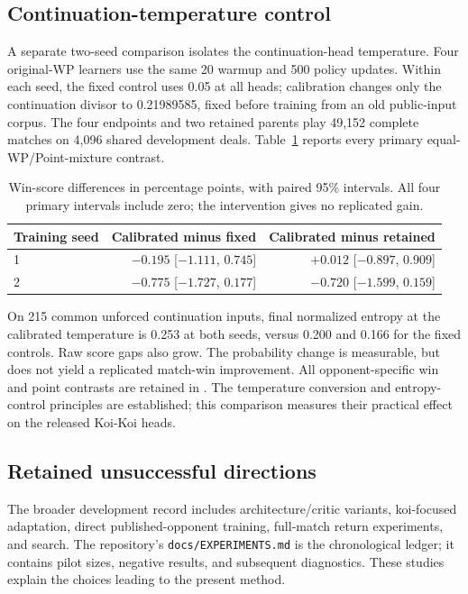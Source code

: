\documentclass[11pt]{article}
\begin{document}
\subsection{Continuation-temperature control}
\label{app:temperature}
A separate two-seed comparison isolates the continuation-head temperature.
Four original-WP learners use the same 20 warmup and 500 policy updates.
Within each seed, the fixed control uses 0.05 at all heads; calibration changes
only the continuation divisor to 0.21989585, fixed before training from an old
public-input corpus. The four endpoints and two retained parents play 49,152
complete matches on 4,096 shared development deals. Table~\ref{tab:temperature}
reports every primary equal-WP/Point-mixture contrast.

\begin{table}[htbp]
\centering\small
\begin{tabular}{lrr}
\toprule
Training seed & Calibrated minus fixed & Calibrated minus retained \\
\midrule
1 & $-0.195$ [$-1.111$, $0.745$] & $+0.012$ [$-0.897$, $0.909$] \\
2 & $-0.775$ [$-1.727$, $0.177$] & $-0.720$ [$-1.599$, $0.159$] \\
\bottomrule
\end{tabular}
\caption{Win-score differences in percentage points, with paired 95\% intervals.
All four primary intervals include zero; the intervention gives no replicated gain.}
\label{tab:temperature}
\end{table}

On 215 common unforced continuation inputs, final normalized entropy at the
calibrated temperature is 0.253 at both seeds, versus 0.200 and 0.166 for the
fixed controls. Raw score gaps also grow. The probability change is measurable,
but does not yield a replicated match-win improvement. All opponent-specific
win and point contrasts are retained in .
The temperature conversion and entropy-control principles are established;
this comparison measures their practical effect on the released Koi-Koi heads.

\subsection{Retained unsuccessful directions}
The broader development record includes architecture/critic variants,
koi-focused adaptation, direct published-opponent training, full-match return
experiments, and search. The repository's \texttt{docs/EXPERIMENTS.md} is the
chronological ledger; it contains pilot sizes, negative results, and subsequent
diagnostics. These studies explain the choices leading to the present method.
\end{document}
